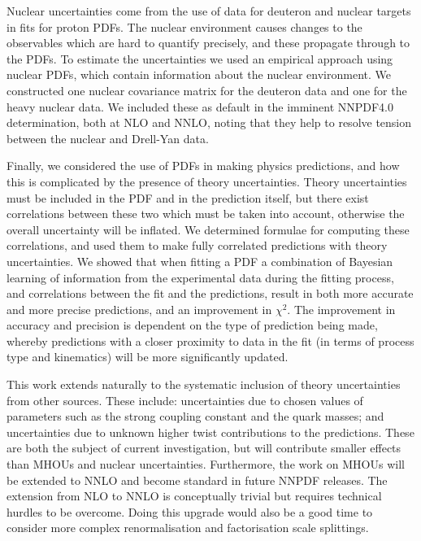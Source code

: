 Nuclear uncertainties come from the use of data for deuteron and nuclear targets in fits for proton PDFs. The nuclear environment causes changes to the observables which are hard to quantify precisely, and these propagate through to the PDFs. To estimate the uncertainties we used an empirical approach using nuclear PDFs, which contain information about the nuclear environment. We constructed one nuclear covariance matrix for the deuteron data and one for the heavy nuclear data. We included these as default in the imminent NNPDF4.0 determination, both at NLO and NNLO, noting that they help to resolve tension between the nuclear and Drell-Yan data. 

Finally, we considered the use of PDFs in making physics predictions, and how this is complicated by the presence of theory uncertainties. Theory uncertainties must be included in the PDF and in the prediction itself, but there exist correlations between these two which must be taken into account, otherwise the overall uncertainty will be inflated. We determined formulae for computing these correlations, and used them to make fully correlated predictions with theory uncertainties. We showed that when fitting a PDF a combination of Bayesian learning of information from the experimental data during the fitting process, and correlations between the fit and the predictions, result in both more accurate and more precise predictions, and an improvement in $\chi^2$. The improvement in accuracy and precision is dependent on the type of prediction being made, whereby predictions with a closer proximity to data in the fit (in terms of process type and kinematics) will be more significantly updated.

This work extends naturally to the systematic inclusion of theory uncertainties from other sources. These include: uncertainties due to chosen values of parameters such as the strong coupling constant and the quark masses; and uncertainties due to unknown higher twist contributions to the predictions. These are both the subject of current investigation, but will contribute smaller effects than MHOUs and nuclear uncertainties. Furthermore, the work on MHOUs will be extended to NNLO and become standard in future NNPDF releases. The extension from NLO to NNLO is conceptually trivial but requires technical hurdles to be overcome. Doing this upgrade would also be a good time to consider more complex renormalisation and factorisation scale splittings. 
